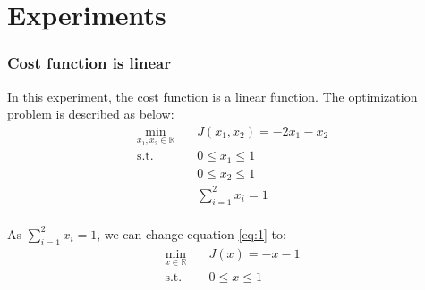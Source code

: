 \documentclass[a4paper,12pt]{article}
\begin{document}
\part{Experiments}
\section{Cost function is linear}
In this experiment, the cost function is a linear function. The optimization problem is described as below:\\


\begin{equation}\label{eq:1}
\begin{aligned}
\min_{x_1,x_2\in \mathbb{R}} \quad & J(x_1,x_2) = -2x_1-x_2\\
\textrm{s.t.} \quad & 0 \leq x_1 \leq 1\\
              \quad & 0 \leq x_2 \leq 1\\
              \quad & \sum_{i=1}^{2} x_i = 1\\
\end{aligned}
\end{equation}


As $\sum_{i=1}^{2} x_i = 1$, we can change equation \ref{eq:1} to:\\
\begin{equation}\label{eq:2}
\begin{aligned}
\min_{x\in \mathbb{R}} \quad & J(x) = -x-1\\
\textrm{s.t.} \quad & 0 \leq x \leq 1\\
\end{aligned}
\end{equation}


\end{document}
